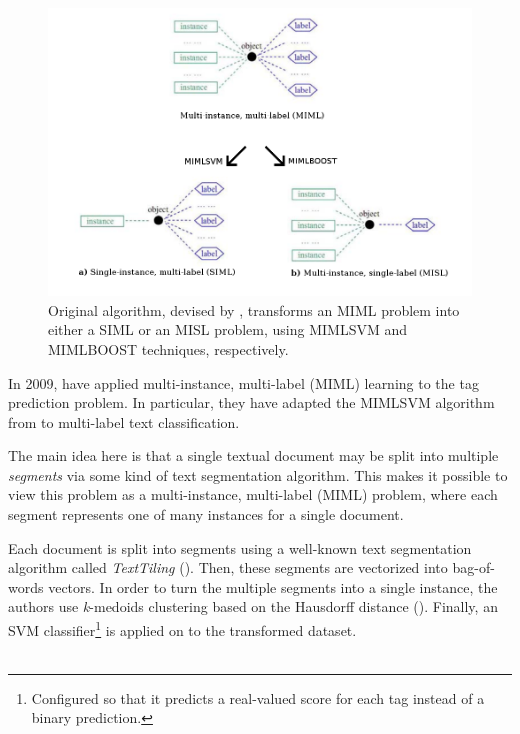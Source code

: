 \begin{figure}[H]
    \centering
    \includegraphics[width=\textwidth]{chapters/05_experiments/images/miml2.png}
    \caption{Original algorithm, devised by \cite{zhou_zhang_2006}, transforms an MIML problem into either a SIML or an MISL problem, using MIMLSVM and MIMLBOOST techniques, respectively.}
    \label{fig:mimlsvm1}
\end{figure}

In 2009, \citeauthor{shen_etal_2009} have applied multi-instance, multi-label (MIML) learning to the tag prediction problem. In particular, they have adapted the MIMLSVM algorithm from \cite{zhou_zhang_2006} to multi-label text classification.

The main idea here is that a single textual document may be split into multiple \textit{segments} via some kind of text segmentation algorithm. This makes it possible to view this problem as a multi-instance, multi-label (MIML) problem, where each segment represents one of many instances for a single document.

Each document is split into segments using a well-known text segmentation algorithm called \textit{TextTiling} (\cite{hearst_1994}). Then, these segments are vectorized into bag-of-words vectors. In order to turn the multiple segments into a single instance, the authors use \textit{k}-medoids clustering based on the Hausdorff distance (\cite{edgar_2008}). Finally, an SVM classifier\footnote{Configured so that it predicts a real-valued score for each tag instead of a binary prediction.} is applied on to the transformed dataset.\\ \\


